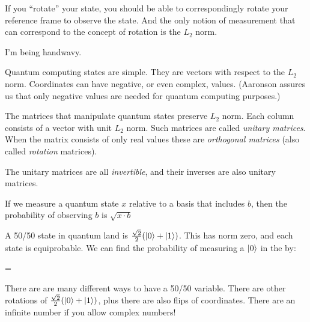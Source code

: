\begin{remark}
  If you ``rotate'' your state, you should be able to correspondingly
  rotate your reference frame to observe the state. And the only notion
  of measurement that can correspond to the concept of rotation is the
  $L_2$ norm.

  I'm being handwavy.
\end{remark}

\begin{remark}
  Quantum computing states are simple. They are vectors with respect to
  the $L_2$ norm. Coordinates can have negative, or even complex,
  values. (Aaronson assures us that only negative values are needed for
  quantum computing purposes.)

  The matrices that manipulate quantum states preserve $L_2$ norm. Each
  column consists of a vector with unit $L_2$ norm. Such matrices are
  called \emph{unitary matrices}. When the matrix consists of only real
  values these are \emph{orthogonal matrices} (also called
  \emph{rotation} matrices).

  The unitary matrices are all \emph{invertible}, and their inverses are
  also unitary matrices.
\end{remark}

\begin{remark}
  If we measure a quantum state $x$ relative to a basis that includes
  $b$, then the probability of observing $b$ is $\sqrt{x \cdot b}$
\end{remark}

\begin{example}
  A 50/50 state in quantum land is $\frac{\sqrt{2}}{2}
  \mathopen{}\left( {|0\rangle + |1\rangle} \right)\mathclose{}$. This has norm zero, and each state
  is equiprobable. We can find the probability of measuring a
  $|0\rangle$ in the  by:

  \begin{nedqn}
  \eqcol
  =
  \end{nedqn}

  There are are many different ways to have a 50/50 variable. There are
  other rotations of $\frac{\sqrt{2}}{2} \mathopen{}\left( {|0\rangle +
  |1\rangle} \right)\mathclose{}$, plus there are also flips of coordinates. There are an
  infinite number if you allow complex numbers!
\end{example}

